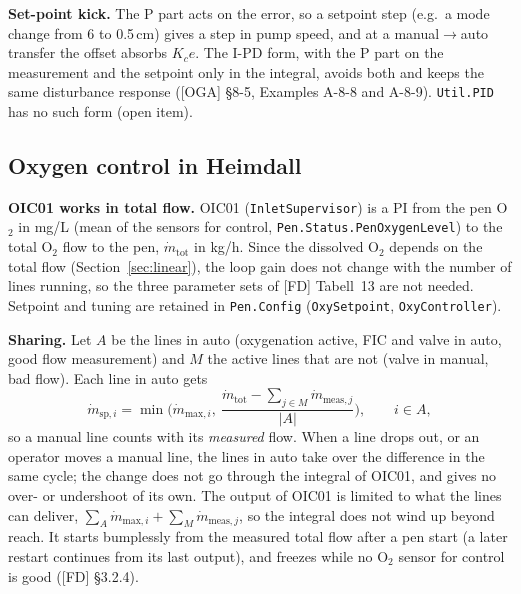 \documentclass[11pt]{article}
\begin{document}
\textbf{Set-point kick.} The P part acts on the error, so a setpoint step (e.g.\ a mode change
from 6 to 0.5\,cm) gives a step in pump speed, and at a manual$\to$auto transfer the offset
absorbs $K_ce$. The I-PD form, with the P part on the measurement and the setpoint only in the
integral, avoids both and keeps the same disturbance response ([OGA] §8-5, Examples A-8-8 and
A-8-9). \texttt{Util.PID} has no such form (open item).

\subsection{Oxygen control in Heimdall}\label{sec:oxyctl}
\textbf{OIC01 works in total flow.} OIC01 (\texttt{InletSupervisor}) is a PI from the pen O$_2$
in mg/L (mean of the sensors for control, \texttt{Pen.Status.PenOxygenLevel}) to the total O$_2$
flow to the pen, $\dot m_\text{tot}$ in kg/h. Since the dissolved O$_2$ depends on the total flow
(Section~\ref{sec:linear}), the loop gain does not change with the number of lines running, so the
three parameter sets of [FD] Tabell~13 are not needed. Setpoint and tuning are retained in
\texttt{Pen.Config} (\texttt{OxySetpoint}, \texttt{OxyController}).

\textbf{Sharing.} Let $A$ be the lines in auto (oxygenation active, FIC and valve in auto, good flow
measurement) and $M$ the active lines that are not (valve in manual, bad flow). Each line in auto
gets
\begin{equation}
\dot m_{\text{sp},i} = \min\!\Big(\dot m_{\text{max},i},\ \frac{\dot m_\text{tot} - \sum_{j\in M}
\dot m_{\text{meas},j}}{|A|}\Big), \qquad i \in A,
\end{equation}
so a manual line counts with its \emph{measured} flow. When a line drops out, or an operator moves a
manual line, the lines in auto take over the difference in the same cycle; the change does not go
through the integral of OIC01, and gives no over- or undershoot of its own. The output of OIC01 is
limited to what the lines can deliver, $\sum_{A}\dot m_{\text{max},i} + \sum_{M}\dot
m_{\text{meas},j}$, so the integral does not wind up beyond reach. It starts bumplessly from the
measured total flow after a pen start (a later restart continues from its last output), and freezes while no O$_2$ sensor for control is good ([FD] §3.2.4).
\end{document}
